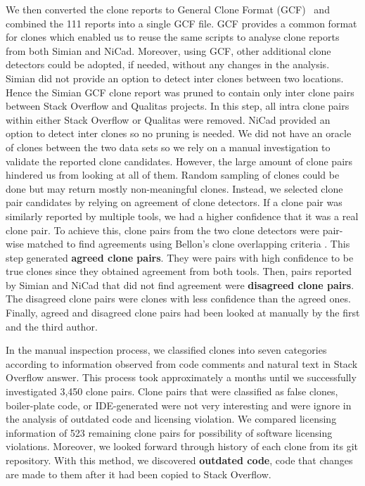 \documentclass[sigconf,review, anonymous]{acmart}
\begin{document}
We then converted the clone reports to General Clone Format (GCF)~\cite{Wang2013} and combined the 111 reports into a single GCF file. GCF provides a common format for clones which enabled us to reuse the same scripts to analyse clone reports from both Simian and NiCad. Moreover, using GCF, other additional clone detectors could be adopted, if needed, without any changes in the analysis. Simian did not provide an option to detect inter clones between two locations. Hence the Simian GCF clone report was pruned to contain only inter clone pairs between Stack Overflow and Qualitas projects. In this step, all intra clone pairs within either Stack Overflow or Qualitas were removed. NiCad provided an option to detect inter clones so no pruning is needed. We did not have an oracle of clones between the two data sets so we rely on a manual investigation to validate the reported clone candidates. However, the large amount of clone pairs hindered us from looking at all of them. Random sampling of clones could be done but may return mostly non-meaningful clones. Instead, we selected clone pair candidates by relying on agreement of clone detectors. If a clone pair was similarly reported by multiple tools, we had a higher confidence that it was a real clone pair. To achieve this, clone pairs from the two clone detectors were pair-wise matched to find agreements using Bellon's clone overlapping criteria \cite{Bellon2007}. This step generated \textbf{agreed clone pairs}. They were pairs with high confidence to be true clones since they obtained agreement from both tools. Then, pairs reported by Simian and NiCad that did not find agreement were \textbf{disagreed clone pairs}. The disagreed clone pairs were clones with less confidence than the agreed ones. Finally, agreed and disagreed clone pairs had been looked at manually by the first and the third author.

In the manual inspection process, we classified clones into seven categories according to information observed from code comments and natural text in Stack Overflow answer. This process took approximately a months until we successfully investigated 3,450 clone pairs. Clone pairs that were classified as false clones, boiler-plate code, or IDE-generated were not very interesting and were ignore in the analysis of outdated code and licensing violation. 
We compared licensing information of 523 remaining clone pairs for possibility of software licensing violations. Moreover, we looked forward through history of each clone from its git repository. With this method, we discovered \textbf{outdated code}, code that changes are made to them after it had been copied to Stack Overflow. %
\end{document}
